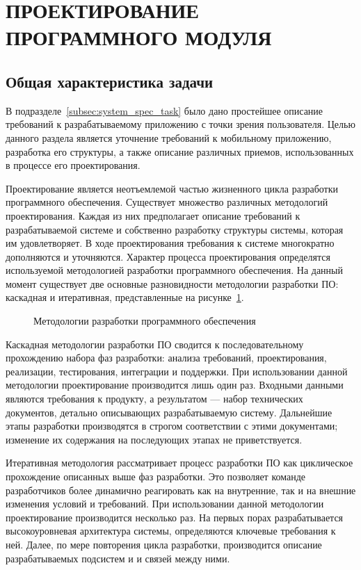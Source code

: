 \section[Проектирование программного модуля]{%
  ПРОЕКТИРОВАНИЕ ПРОГРАММНОГО МОДУЛЯ
}\label{sec:design}

\subsection{Общая характеристика задачи}

В подразделе~\ref{subsec:system_spec_task} было дано простейшее
описание требований к разрабатываемому приложению с точки зрения пользователя.
Целью данного раздела является уточнение требований к мобильному приложению,
разработка его структуры, а также описание различных приемов,
использованных в процессе его проектирования.

Проектирование является неотъемлемой частью жизненного цикла
разработки программного обеспечения.
Существует множество различных методологий проектирования.
Каждая из них предполагает описание требований к разрабатываемой системе
и собственно разработку структуры системы, которая им удовлетворяет.
В ходе проектирования требования к системе многократно дополняются и уточняются.
Характер процесса проектирования определятся используемой
методологией разработки программного обеспечения.
На данный момент существует две основные разновидности методологии разработки ПО:
каскадная и итеративная, представленные на рисунке~\ref{fig:design_methods}.

\begin{figure}[h!]
  \centering
  \caption{Методологии разработки программного обеспечения}
  \label{fig:design_methods}
\end{figure}

Каскадная методологии разработки ПО сводится к последовательному
прохождению набора фаз разработки:
анализа требований, проектирования, реализации, тестирования, интеграции и поддержки.
При использовании данной методологии проектирование производится
лишь один раз. Входными данными являются требования к продукту,
а результатом --- набор технических документов, детально описывающих
разрабатываемую систему.
Дальнейшие этапы разработки производятся в строгом соответствии с этими документами;
изменение их содержания на последующих этапах не приветствуется.

Итеративная методология рассматривает процесс разработки ПО как
циклическое прохождение описанных выше фаз разработки.
Это позволяет команде разработчиков более динамично реагировать
как на внутренние, так и на внешние изменения условий и требований.
При использовании данной методологии проектирование производится несколько раз.
На первых порах разрабатывается высокоуровневая архитектура системы,
определяются ключевые требования к ней. Далее, по мере повторения цикла
разработки, производится описание разрабатываемых подсистем и и связей между ними.

